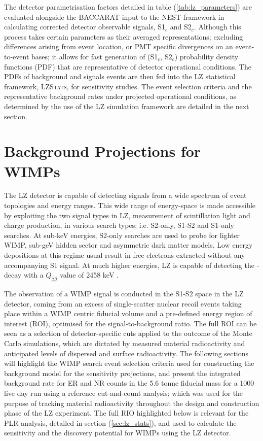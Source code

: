 The detector parametrisation factors detailed in table (\ref{tab:lz_parameters}) are evaluated alongside the \textsc{BACCARAT} input to the \textsc{NEST} framework in calculating corrected detector observable signals, S1$_{c}$ and S2$_{c}$. Although this process takes certain parameters as their averaged representations; excluding differences arising from event location, or PMT specific divergences on an event-to-event bases; it allows for fast generation of (S1$_{c}$, S2$_{c}$) probability density functions (PDF) that are representative of detector operational conditions. The PDFs of background and signals events are then fed into the LZ statistical framework, \textsc{LZStats}, for sensitivity studies. The event selection criteria and the representative background rates under projected operational conditions, as determined by the use of the LZ simulation framework are detailed in the next section.   



\section{Background Projections for WIMPs}
\label{sec:uclradon}

The LZ detector is capable of detecting signals from a wide spectrum of event topologies and energy ranges. This wide range of energy-space is made accessible by exploiting the two signal types in LZ, measurement of scintillation light and charge production, in various search types; i.e. S2-only, S1-S2 and S1-only searches. At sub-keV energies, S2-only searches are used to probe for lighter WIMP, sub-geV hidden sector and asymmetric dark matter models. Low energy depositions at this regime usual result in free electrons extracted without any accompanying S1 signal. At much higher energies, LZ is capable of detecting the \XeOTS{} \neutrinolessDoubleBeta{}-decay with a $Q_{\beta \beta}$ value of 2458 keV \cite{Akerib_2020_double_beta}.

The observation of a WIMP signal is conducted in the S1-S2 space in the LZ detector, coming from an excess of single-scatter nuclear recoil events taking place within a WIMP centric fiducial volume and a pre-defined energy region of interest (ROI), optimised for the signal-to-background ratio. The full ROI can be seen as a selection of detector-specific cuts applied to the outcome of the Monte Carlo simulations, which are dictated by measured material radioactivity and anticipated levels of dispersed and surface radioactivity. The following sections will highlight the WIMP search event selection criteria used for constructing the background model for the sensitivity projections, and present the integrated background rate for ER and NR counts in the 5.6 tonne fiducial mass for a 1000 live day run using a reference cut-and-count analysis; which was used for the purpose of tracking material radioactivity throughout the design and construction phase of the LZ experiment. The full RIO highlighted below is relevant for the PLR analysis, detailed in section (\ref{sec:lz_stats}), and used to calculate the sensitivity and the discovery potential for WIMPs using the LZ detector.


